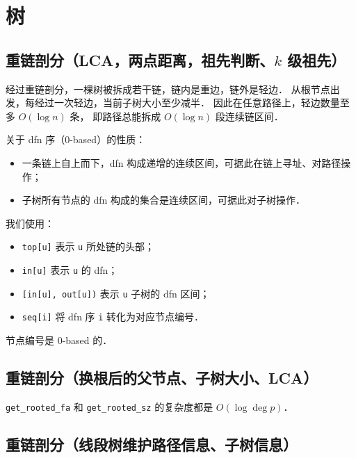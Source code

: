 \section{树}

\subsection{重链剖分（LCA，两点距离，祖先判断、\texorpdfstring{$k$}{k} 级祖先）}

经过重链剖分，一棵树被拆成若干链，链内是重边，链外是轻边．
从根节点出发，每经过一次轻边，当前子树大小至少减半．
因此在任意路径上，轻边数量至多 $O(\log n)$ 条，
即路径总能拆成 $O(\log n)$ 段连续链区间．

关于 dfn 序（0-based）的性质：
\begin{itemize}[noitemsep]
    \item 一条链上自上而下，dfn 构成递增的连续区间，可据此在链上寻址、对路径操作；
    \item 子树所有节点的 dfn 构成的集合是连续区间，可据此对子树操作．
\end{itemize}

我们使用：
\begin{itemize}[noitemsep]
    \item {\tt top[u]} 表示 {\tt u} 所处链的头部；
    \item {\tt in[u]} 表示 {\tt u} 的 dfn；
    \item {\tt [in[u], out[u])} 表示 {\tt u} 子树的 dfn 区间；
    \item {\tt seq[i]} 将 dfn 序 {\tt i} 转化为对应节点编号．
\end{itemize}

节点编号是 0-based 的．



\subsection{重链剖分（换根后的父节点、子树大小、LCA）}

{\tt get\_rooted\_fa} 和 {\tt get\_rooted\_sz} 的复杂度都是 $O(\log \deg p)$．



\newpage

\subsection{重链剖分（线段树维护路径信息、子树信息）}

